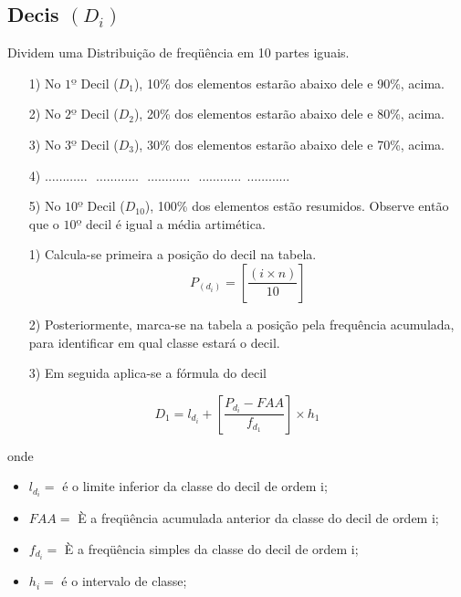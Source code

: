 \subsection{Decis $(D_{i})$}

Dividem uma Distribuição de freqüência em 10 partes iguais.


\begin{enumerate}
  \item[{1)}] No $1º$ Decil ($D_{1}$), 10\% dos elementos estarão abaixo dele e 90\%, acima.
  \item[{2)}] No $2º$ Decil ($D_{2}$), 20\% dos elementos estarão abaixo dele e 80\%, acima.
  \item[{3)}] No $3º$ Decil ($D_{3}$), 30\% dos elementos estarão abaixo dele e 70\%, acima.
  \item[{4)}] $\ldots \ldots \ldots \ldots \ \ \  \ldots \ldots \ldots \ldots \ \ \  \ldots \ldots \ldots \ldots \ \ \  \ldots \ldots \ldots \ldots \ \ \ldots \ldots \ldots \ldots$
 \item[{5)}] No $10º$ Decil ($D_{10}$), 100\% dos elementos estão resumidos. Observe então que o $10º$ decil é igual a média artimética.
\end{enumerate}

\begin{enumerate}
\item [{1)}]Calcula-se primeira a posição do decil na tabela.
$$ P_{(d_{i})} = \left[ \frac{(i \times n)}{10} \right] $$
\item [{2)}] Posteriormente, marca-se na tabela a posição pela frequência acumulada, para identificar em qual classe estará o decil.
\item [{3)}] Em seguida aplica-se a fórmula do decil
\end{enumerate}

\begin{equation}\label{}
    D_{1}= l_{d_{i}}+\left[\frac{P_{d_{i}}-FAA}{f_{d_{1}}}\right]\times h_{1}
\end{equation}

 onde

 \begin{itemize}
   \item $l_{d_{i}}=$ é o limite inferior da classe do decil de ordem i;
   \item $FAA=$ È a freqüência acumulada anterior da classe do decil de ordem i;
   \item $f_{d_{i}}=$ È a freqüência simples da classe do decil de ordem i;
   \item $h_{i}=$ é o intervalo de classe;
 \end{itemize}



